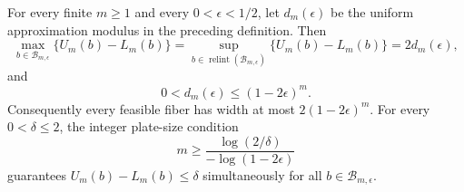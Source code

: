 For every finite \(m\geq1\) and every \(0<\epsilon<1/2\), let \(d_m(\epsilon)\) be the uniform approximation modulus in the preceding definition.  Then
\[
 \max_{b\in\mathcal B_{m,\epsilon}}\{U_m(b)-L_m(b)\}
 =\sup_{b\in\operatorname{relint}(\mathcal B_{m,\epsilon})}\{U_m(b)-L_m(b)\}
 =2d_m(\epsilon),
\]
and
\[
 0<d_m(\epsilon)\leq(1-2\epsilon)^m.
\]
Consequently every feasible fiber has width at most \(2(1-2\epsilon)^m\).  For every \(0<\delta\leq2\), the integer plate-size condition
\[
 m\geq\frac{\log(2/\delta)}{-\log(1-2\epsilon)}
\]
guarantees \(U_m(b)-L_m(b)\leq\delta\) simultaneously for all \(b\in\mathcal B_{m,\epsilon}\).